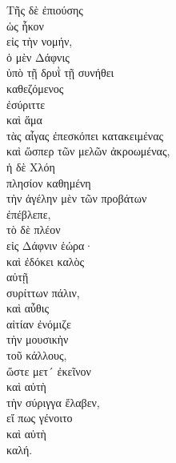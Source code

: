 {\large
\begin{greek}
\noindent Τῆς δὲ ἐπιούσης \\
\tabto{2em} ὡς ἧκον \\
\tabto{4em} εἰς τὴν νομήν, \\
ὁ μὲν Δάφνις \\
\tabto{2em} ὑπὸ τῇ δρυῒ τῇ συνήθει \\
\tabto{4em} καθεζόμενος \\
\tabto{6em} ἐσύριττε \\
καὶ ἅμα \\
\tabto{4em} τὰς αἶγας ἐπεσκόπει κατακειμένας \\
\tabto{6em} καὶ ὥσπερ τῶν μελῶν ἀκροωμένας, \\
ἡ δὲ Χλόη \\
\tabto{2em} πλησίον καθημένη \\
\tabto{2em} τὴν ἀγέλην μὲν τῶν προβάτων \\
\tabto{4em} ἐπέβλεπε, \\
\tabto{2em} τὸ δὲ πλέον \\
\tabto{4em} εἰς Δάφνιν ἑώρα· \\
καὶ ἐδόκει καλὸς \\
\tabto{2em} αὐτῇ \\
συρίττων πάλιν, \\
καὶ αὖθις \\
\tabto{2em} αἰτίαν ἐνόμιζε \\
\tabto{4em} τὴν μουσικὴν \\
\tabto{6em} τοῦ κάλλους, \\
ὥστε μετ´ ἐκεῖνον \\
\tabto{2em} καὶ αὐτὴ \\
\tabto{4em} τὴν σύριγγα ἔλαβεν, \\
\tabto{6em} εἴ πως γένοιτο \\
\tabto{6em} καὶ αὐτὴ \\
\tabto{8em} καλή.\\

\end{greek}
}

